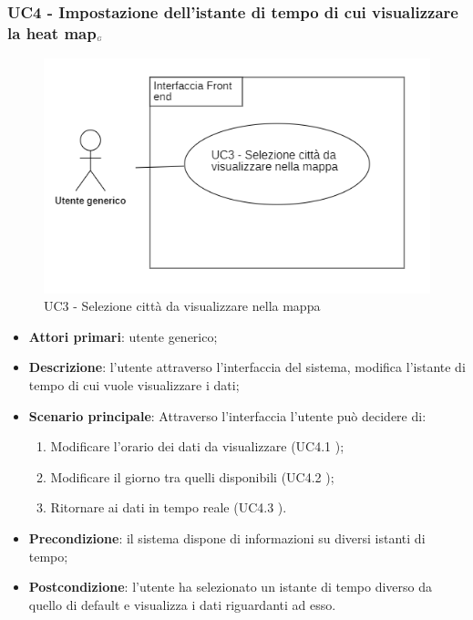 \subsubsection{UC4 - Impostazione dell’istante di tempo di cui visualizzare la heat map$_{\scaleto{G}{3pt}}$
} %
\begin{center}
	\begin{figure}[H]
		\includegraphics{../immagini/attori_casi/uc3.png}
		\caption{UC3 - Selezione città da visualizzare nella mappa}
	\end{figure}
\end{center}
\begin{itemize}
	\item \textbf{Attori primari}: utente generico;
	\item \textbf{Descrizione}: l’utente attraverso l’interfaccia del sistema, modifica l’istante di tempo di cui vuole visualizzare i dati;
	\item \textbf{Scenario principale}: Attraverso l’interfaccia l’utente può decidere di:
		\begin{enumerate}
			\item Modificare l’orario dei dati da visualizzare (UC4.1 );
			\item Modificare il giorno tra quelli disponibili (UC4.2 );
			\item Ritornare ai dati in tempo reale (UC4.3 ).
		\end{enumerate}
	\item \textbf{Precondizione}: il sistema dispone di informazioni su diversi istanti di tempo;
	\item \textbf{Postcondizione}: l’utente ha selezionato un istante di tempo diverso da quello di default e visualizza i dati riguardanti ad esso.%
\end{itemize}

